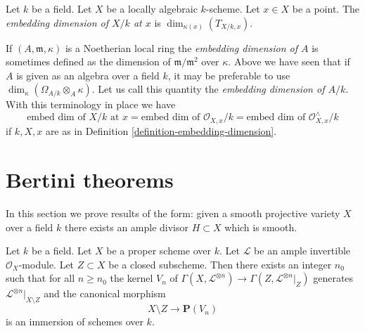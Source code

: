 \begin{definition}
\label{definition-embedding-dimension}
Let $k$ be a field. Let $X$ be a locally algebraic $k$-scheme.
Let $x \in X$ be a point. The {\it embedding dimension of $X/k$ at $x$}
is $\dim_{\kappa(x)}(T_{X/k, x})$.
\end{definition}

\noindent
If $(A, \mathfrak m, \kappa)$ is a Noetherian local ring
the {\it embedding dimension of $A$} is sometimes defined as the dimension of
$\mathfrak m/\mathfrak m^2$ over $\kappa$. Above we have seen that
if $A$ is given as an algebra over a field $k$, it may be preferable
to use $\dim_\kappa(\Omega_{A/k} \otimes_A \kappa)$. Let
us call this quantity the {\it embedding dimension of $A/k$}.
With this terminology in place we have
$$
\text{embed dim of }X/k\text{ at }x =
\text{embed dim of }\mathcal{O}_{X, x}/k =
\text{embed dim of }\mathcal{O}_{X, x}^\wedge/k
$$
if $k, X, x$ are as in Definition \ref{definition-embedding-dimension}.






\section{Bertini theorems}
\label{section-bertini}

\noindent
In this section we prove results of the form: given a smooth projective
variety $X$ over a field $k$ there exists an ample divisor $H \subset X$
which is smooth.

\begin{lemma}
\label{lemma-generate-over-complement}
Let $k$ be a field. Let $X$ be a proper scheme over $k$. Let $\mathcal{L}$
be an ample invertible $\mathcal{O}_X$-module. Let $Z \subset X$ be a
closed subscheme. Then there exists an integer $n_0$ such that for all
$n \geq n_0$ the kernel $V_n$ of
$\Gamma(X, \mathcal{L}^{\otimes n}) \to \Gamma(Z, \mathcal{L}^{\otimes n}|_Z)$
generates $\mathcal{L}^{\otimes n}|_{X \setminus Z}$ and
the canonical morphism
$$
X \setminus Z \longrightarrow \mathbf{P}(V_n)
$$
is an immersion of schemes over $k$.
\end{lemma}

